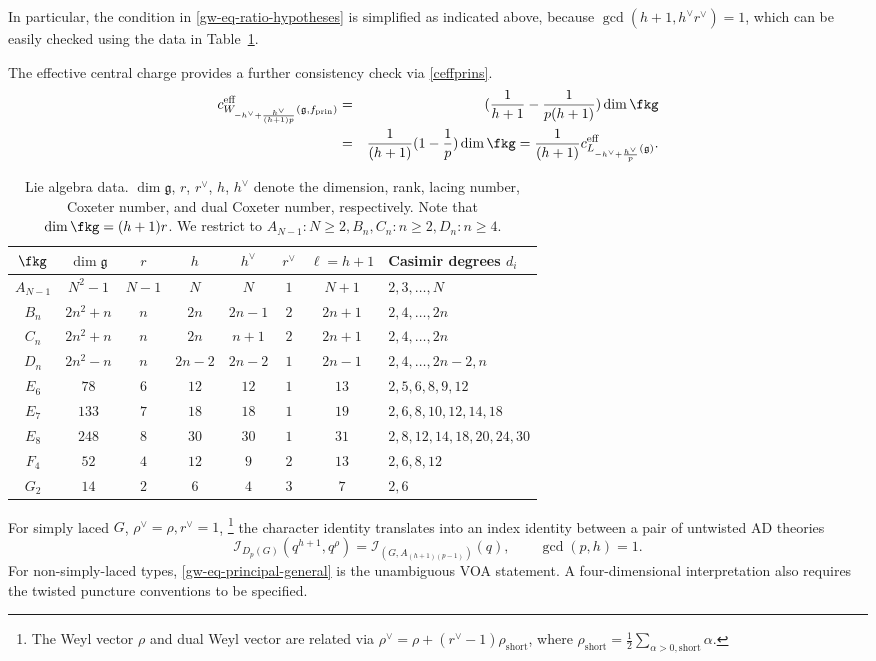 \documentclass[a4paper,11pt]{article}
\theoremstyle{definition}
\theoremstyle{definition}
\theoremstyle{remark}
\newcommand{\ceff}{c^\text{eff}}
\newcommand{\prin}{ \text{prin}}
\newcommand{\be}{\begin{equation}}
\newcommand{\ee}{\end{equation}}
\newcommand{\beqn}{\begin{eqnarray}}
\newcommand{\eeqn}{\end{eqnarray}}
\begin{document}
In particular, the condition in \eqref{gw-eq-ratio-hypotheses} is simplified as indicated above, because $\gcd(h+1,h^\vee r^\vee)=1$, which can be easily checked using the data in  Table~\ref{Liedata}. 

The effective central charge provides a further consistency check via  \eqref{ceffprins}. 
     \beqn
  \ceff_{    W_{-h^\vee+\frac{h^\vee}{ (h+1) p }}(\mathfrak g,f_\prin) }&=&(\frac{1}{h+1}-\frac{1}{p(h+1)})\dim \fkg
  \\&=&
  \frac{1}{(h+1)}(1-\frac{1}{p })\dim \fkg
  =  \frac{1}{(h+1)}\ceff_{  L_{-h^\vee+\frac{h^\vee}{   p }}(\mathfrak g )}.
  \eeqn
  
  
 \begin{table}
\centering
\begin{tabular}{c|c|c|c|c|c|c|l} \hline
$\fkg$ & $\dim \mathfrak{g}$ & $r$ & $h$ & $h^\vee$ & $r^\vee$ & $\ell=h+1$ & Casimir degrees $d_i$ \\\hline
$A_{N-1}$ & $N^2-1$ & $N-1$ & $N$ & $N$ & $1$ & $N+1$ & $2, 3, \dots, N$\\
$B_n$ & $2n^2+n$ & $n$ & $2n$ & $2n-1$ & $2$ & $2n+1$ & $2, 4, \dots, 2n$\\
$C_n$ & $2n^2+n$ & $n$ & $2n$ & $n+1$ & $2$ & $2n+1$ & $2, 4, \dots, 2n$\\
$D_n$ & $2n^2-n$ & $n$ & $2n-2$ & $2n-2$ & $1$ & $2n-1$ & $2, 4, \dots, 2n-2, n$\\
$E_6$ & $78$ & $6$ & $12$ & $12$ & $1$ & $13$ & $2, 5, 6, 8, 9, 12$\\
$E_7$ & $133$ & $7$ & $18$ & $18$ & $1$ & $19$ & $2, 6, 8, 10, 12, 14, 18$\\
$E_8$ & $248$ & $8$ & $30$ & $30$ & $1$ & $31$ & $2, 8, 12, 14, 18, 20, 24, 30$\\
$F_4$ & $52$ & $4$ & $12$ & $9$ & $2$ & $13$ & $2, 6, 8, 12$\\
$G_2$ & $14$ & $2$ & $6$ & $4$ & $3$ & $7$ & $2, 6$ \\\hline
\end{tabular} \caption{Lie algebra data. $\dim \mathfrak{g}$, $r$, $r^\vee$, $h$, $h^\vee$ denote the dimension, rank, lacing number, Coxeter number, and dual Coxeter number, respectively. Note that $\dim\fkg =(h+1) r$. We restrict to $A_{N-1}: N \ge 2,   B_n, C_n: n \ge 2,   D_n: n \ge 4$.}
\label{Liedata}
\end{table}

 

 
For simply laced $G$, $\rho^\vee=\rho, r^\vee=1$, \footnote{ 
The Weyl vector $\rho$ and dual Weyl vector are related via $\rho^\vee = \rho + ( r^\vee - 1)\rho_{\mathrm{short}} 
$, where $\rho_{\mathrm{short}} = \frac{1}{2} \sum_{\alpha>0,\mathrm{short}} \alpha.
$}
the character identity translates  into an index identity between a pair of untwisted
AD theories
\be
 \mathcal I_{D_p(G)}(q^{h+1},q^\rho)
 =\mathcal I_{(G,A_{(h+1)(p-1)})}(q),\qquad \gcd(p,h)=1.
 \label{gw-eq-ADE}
\ee
For non-simply-laced types, \eqref{gw-eq-principal-general} is the
unambiguous VOA statement.  A four-dimensional interpretation also
requires the twisted  puncture conventions to be specified.
\end{document}
